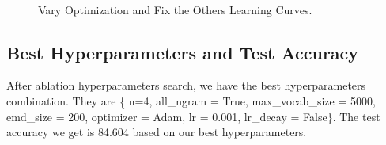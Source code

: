 \documentclass[10pt,a4paper]{article}
\begin{document}
\begin{figure}[!ht]
{}		\\
\caption{\label{fig:optim}Vary Optimization and Fix the Others Learning Curves.}
\end{figure}
\subsection{Best Hyperparameters and Test Accuracy}
After ablation hyperparameters search, we have the best hyperparameters combination. They are \{ n=4, all\_ngram = True, max\_vocab\_size = 5000, emd\_size = 200, optimizer = Adam, lr = 0.001, lr\_decay = False\}. The test accuracy we get is 84.604 based on our best hyperparameters.
\end{document}
